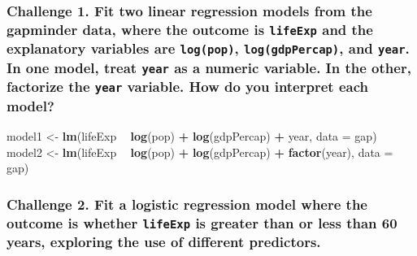 \documentclass[]{book}
\newenvironment{Shaded}{\begin{snugshade}}{\end{snugshade}}
\newcommand{\KeywordTok}[1]{\textcolor[rgb]{0.13,0.29,0.53}{\textbf{#1}}}
\newcommand{\DataTypeTok}[1]{\textcolor[rgb]{0.13,0.29,0.53}{#1}}
\newcommand{\StringTok}[1]{\textcolor[rgb]{0.31,0.60,0.02}{#1}}
\newcommand{\OperatorTok}[1]{\textcolor[rgb]{0.81,0.36,0.00}{\textbf{#1}}}
\newcommand{\NormalTok}[1]{#1}
\begin{document}
\subsubsection*{\texorpdfstring{Challenge 1. Fit two linear regression
models from the gapminder data, where the outcome is \texttt{lifeExp}
and the explanatory variables are \texttt{log(pop)},
\texttt{log(gdpPercap)}, and \texttt{year}. In one model, treat
\texttt{year} as a numeric variable. In the other, factorize the
\texttt{year} variable. How do you interpret each
model?}{Challenge 1. Fit two linear regression models from the gapminder data, where the outcome is lifeExp and the explanatory variables are log(pop), log(gdpPercap), and year. In one model, treat year as a numeric variable. In the other, factorize the year variable. How do you interpret each model?}}\label{challenge-1.-fit-two-linear-regression-models-from-the-gapminder-data-where-the-outcome-is-lifeexp-and-the-explanatory-variables-are-logpop-loggdppercap-and-year.-in-one-model-treat-year-as-a-numeric-variable.-in-the-other-factorize-the-year-variable.-how-do-you-interpret-each-model}

\begin{Shaded}
\begin{Highlighting}[]
\NormalTok{model1 <-}\StringTok{ }\KeywordTok{lm}\NormalTok{(lifeExp }\OperatorTok{~}\StringTok{ }\KeywordTok{log}\NormalTok{(pop) }\OperatorTok{+}\StringTok{ }\KeywordTok{log}\NormalTok{(gdpPercap) }\OperatorTok{+}\StringTok{ }\NormalTok{year, }\DataTypeTok{data =}\NormalTok{ gap)}
\NormalTok{model2 <-}\StringTok{ }\KeywordTok{lm}\NormalTok{(lifeExp }\OperatorTok{~}\StringTok{ }\KeywordTok{log}\NormalTok{(pop) }\OperatorTok{+}\StringTok{ }\KeywordTok{log}\NormalTok{(gdpPercap) }\OperatorTok{+}\StringTok{ }\KeywordTok{factor}\NormalTok{(year), }\DataTypeTok{data =}\NormalTok{ gap)}
\end{Highlighting}
\end{Shaded}

\subsubsection*{\texorpdfstring{Challenge 2. Fit a logistic regression
model where the outcome is whether \texttt{lifeExp} is greater than or
less than 60 years, exploring the use of different
predictors.}{Challenge 2. Fit a logistic regression model where the outcome is whether lifeExp is greater than or less than 60 years, exploring the use of different predictors.}}\label{challenge-2.-fit-a-logistic-regression-model-where-the-outcome-is-whether-lifeexp-is-greater-than-or-less-than-60-years-exploring-the-use-of-different-predictors.}
\end{document}
